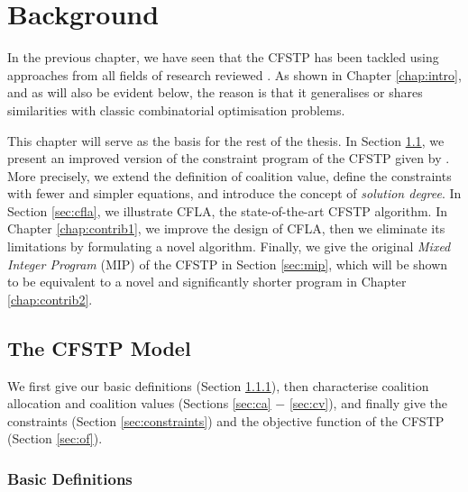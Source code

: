 \chapter{Background}\label{chap:background}

In the previous chapter, we have seen that the CFSTP has been tackled using approaches
from all fields of research reviewed
\cite{ramchurn2010cfstp,ramchurn2010fms,ramchurn2015a,baker2016,nelke2020,tkach2021}. As
shown in Chapter \ref{chap:intro}, and as will also be evident below, the reason is that
it generalises or shares similarities with classic combinatorial optimisation problems.

This chapter will serve as the basis for the rest of the thesis. In Section
\ref{sec:cfstp}, we present an improved version of the constraint program of the CFSTP
given by \cite{ramchurn2010cfstp}. More precisely, we extend the definition of coalition
value, define the constraints with fewer and simpler equations, and introduce the concept
of \emph{solution degree}. In Section \ref{sec:cfla}, we illustrate CFLA, the
state-of-the-art CFSTP algorithm. In Chapter \ref{chap:contrib1}, we improve the design of
CFLA, then we eliminate its limitations by formulating a novel algorithm. Finally, we give
the original \emph{Mixed Integer Program} (MIP) \cite{wolsey2020} of the CFSTP in Section
\ref{sec:mip}, which will be shown to be equivalent to a novel and significantly shorter
program in Chapter \ref{chap:contrib2}.

\section{The CFSTP Model}\label{sec:cfstp}

We first give our basic definitions (Section \ref{sec:defs}), then characterise coalition
allocation and coalition values (Sections \ref{sec:ca} $-$ \ref{sec:cv}), and finally give
the constraints (Section \ref{sec:constraints}) and the objective function of the CFSTP
(Section \ref{sec:of}).

\subsection{Basic Definitions}\label{sec:defs}

